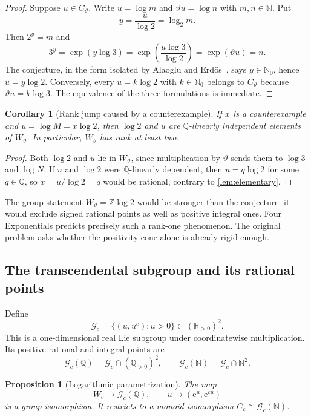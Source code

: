 \documentclass[11pt,oneside]{article}
\newtheorem{proposition}[theorem]{Proposition}
\newtheorem{corollary}[theorem]{Corollary}
\theoremstyle{definition}
\newcommand{\Q}{\mathbb{Q}}
\newcommand{\R}{\mathbb{R}}
\newcommand{\Z}{\mathbb{Z}}
\newcommand{\N}{\mathbb{N}}
\newcommand{\ee}{\mathrm{e}}
\newcommand{\cG}{\mathscr{G}}
\begin{document}
\begin{proof}
Suppose $u\in C_{\vartheta}$.  Write $u=\log m$ and $\vartheta u=\log n$ with $m,n\in\N$.  Put
\[
     y=\frac{u}{\log2}=\log_2m.
\]
Then $2^y=m$ and
\[
     3^y=\exp(y\log3)
         =\exp\!\left(\frac{u\log3}{\log2}\right)
         =\exp(\vartheta u)=n.
\]
The conjecture, in the form isolated by Alaoglu and Erd\H{o}s~\cite{AlaogluErdos1944}, says $y\in\N_0$, hence $u=y\log2$.  Conversely, every $u=k\log2$ with $k\in\N_0$ belongs to $C_{\vartheta}$ because $\vartheta u=k\log3$.  The equivalence of the three formulations is immediate.
\end{proof}

\begin{corollary}[Rank jump caused by a counterexample]\label{cor:rankjump}
If $x$ is a counterexample and $u=\log M=x\log2$, then $\log2$ and $u$ are $\Q$-linearly independent elements of $W_{\vartheta}$.  In particular, $W_{\vartheta}$ has rank at least two.
\end{corollary}

\begin{proof}
Both $\log2$ and $u$ lie in $W_{\vartheta}$, since multiplication by $\vartheta$ sends them to $\log3$ and $\log N$.  If $u$ and $\log2$ were $\Q$-linearly dependent, then $u=q\log2$ for some $q\in\Q$, so $x=u/\log2=q$ would be rational, contrary to \cref{lem:elementary}.
\end{proof}

The group statement $W_{\vartheta}=\Z\log2$ would be stronger than the conjecture: it would exclude signed rational points as well as positive integral ones.  Four Exponentials predicts precisely such a rank-one phenomenon.  The original problem asks whether the positivity cone alone is already rigid enough.

\subsection{The transcendental subgroup and its rational points}

Define
\[
  \cG_c=\{(u,u^c):u>0\}\subset(\R_{>0})^2.
\]
This is a one-dimensional real Lie subgroup under coordinatewise multiplication.  Its positive rational and integral points are
\[
 \cG_c(\Q)=\cG_c\cap(\Q_{>0})^2,
 \qquad
 \cG_c(\N)=\cG_c\cap\N^2.
\]

\begin{proposition}[Logarithmic parametrization]\label{prop:graphpoints}
The map
\[
    W_c\longrightarrow\cG_c(\Q),
    \qquad u\longmapsto(\ee^u,\ee^{cu})
\]
is a group isomorphism.  It restricts to a monoid isomorphism
$C_c\cong\cG_c(\N)$.
\end{proposition}
\end{document}
